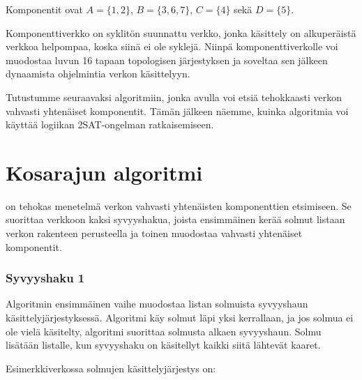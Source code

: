 Komponentit ovat $A=\{1,2\}$,
$B=\{3,6,7\}$, $C=\{4\}$ sekä $D=\{5\}$.

Komponenttiverkko on syklitön suunnattu verkko,
jonka käsittely on alkuperäistä verkkoa
helpompaa, koska siinä ei ole syklejä.
Niinpä komponenttiverkolle voi muodostaa
luvun 16 tapaan topologisen järjestyksen
ja soveltaa sen jälkeen dynaamista ohjelmintia
verkon käsittelyyn.

Tutustumme seuraavaksi algoritmiin,
jonka avulla voi etsiä tehokkaasti verkon
vahvasti yhtenäiset komponentit.
Tämän jälkeen näemme, kuinka algoritmia voi
käyttää logiikan 2SAT-ongelman ratkaisemiseen.

\section{Kosarajun algoritmi}


 on tehokas
menetelmä verkon
vahvasti yhtenäisten komponenttien etsimiseen.
Se suorittaa verkkoon
kaksi syvyyshakua, joista ensimmäinen
kerää solmut listaan verkon rakenteen perusteella
ja toinen muodostaa vahvasti yhtenäiset komponentit.

\subsubsection{Syvyyshaku 1}

Algoritmin ensimmäinen vaihe muodostaa listan solmuista
syvyyshaun käsittelyjärjestyksessä.
Algoritmi käy solmut läpi yksi kerrallaan,
ja jos solmua ei ole vielä käsitelty, algoritmi suorittaa
solmusta alkaen syvyyshaun.
Solmu lisätään listalle, kun syvyyshaku on 
käsitellyt kaikki siitä lähtevät kaaret.

Esimerkkiverkossa solmujen käsittelyjärjestys on:
\begin{center}
\end{center}

